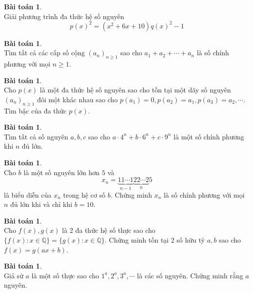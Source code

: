 \documentclass{article}
\theoremstyle{definition}
\newtheorem{exercise}[theorem]{Bài toán}
\begin{document}
\begin{exercise} \ \\
Giải phương trình đa thức hệ số nguyên
$$p(x)^2 = (x^2 + 6x + 10) q(x)^2 - 1$$
\end{exercise}
\begin{exercise} \ \\
Tìm tất cả các cấp số cộng $(a_n)_{n \geq 1}$ sao cho $a_1 + a_2 + \cdots + a_n$ là số chính phương với mọi $n \geq 1$.
\end{exercise}
\begin{exercise} \ \\
Cho $p(x)$ là một đa thức hệ số nguyên sao cho tồn tại một dãy số nguyên $(a_n)_{n \geq 1}$ đôi một khác nhau sao cho $p(a_1) = 0, p(a_2) = a_1, p(a_3) = a_2, \cdots$. Tìm bậc của đa thức $p(x)$.
\end{exercise}
\begin{exercise} \ \\
Tìm tất cả số nguyên $a, b, c$ sao cho $a \cdot 4^n + b \cdot 6^n + c \cdot 9^n$ là một số chính phương khi $n$ đủ lớn.
\end{exercise}
\begin{exercise} \ \\
Cho $b$ là một số nguyên lớn hơn $5$ và
$$x_n = \underbrace{11 \cdots 1}_{n - 1} \underbrace{22 \cdots 2}_n 5$$
là biểu diễn của $x_n$ trong hệ cơ số $b$. Chứng minh $x_n$ là số chính phương với mọi $n$ đủ lớn khi và chỉ khi $b = 10$.
\end{exercise}
\begin{exercise} \ \\
Cho $f(x), g(x)$ là 2 đa thức hệ số thực sao cho $\{ f(x) : x \in \mathbb{Q} \} = \{ g(x) : x \in \mathbb{Q} \}$. Chứng minh tồn tại 2 số hữu tỷ $a, b$ sao cho $f(x) = g(ax + b)$.
\end{exercise}
\begin{exercise} \ \\
Giả sử $a$ là một số thực sao cho $1^a, 2^a, 3^a, \cdots$ là các số nguyên. Chứng minh rằng $a$ nguyên.
\end{exercise}

\newpage
\end{document}
